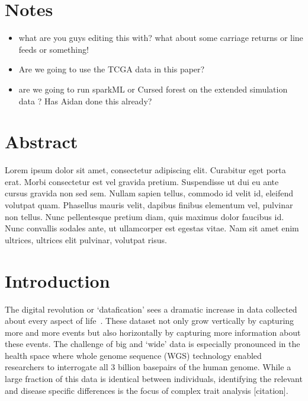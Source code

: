 \documentclass[10pt,letterpaper]{article}
\begin{document}
\section*{Notes}
\begin{itemize}
\item what are you guys editing this with?  what about some carriage
  returns or line feeds or something!
\item Are we going to use the TCGA data in this paper?
\item are we going to run sparkML or Cursed forest on the extended
  simulation data \cite[]{Genuer.et.al.2010}? Has Aidan done this already?
\end{itemize}


\section*{Abstract}
Lorem ipsum dolor sit amet, consectetur adipiscing elit. Curabitur eget porta erat. Morbi consectetur est vel gravida
pretium. Suspendisse ut dui eu ante cursus gravida non sed sem. Nullam sapien tellus, commodo id velit id, eleifend
volutpat quam. Phasellus mauris velit, dapibus finibus elementum vel, pulvinar non tellus. Nunc pellentesque pretium
diam, quis maximus dolor faucibus id. Nunc convallis sodales ante, ut ullamcorper est egestas vitae. Nam sit amet enim
ultrices, ultrices elit pulvinar, volutpat risus.

\linenumbers

\section*{Introduction}

The digital revolution or `datafication' sees a dramatic increase in data collected about every aspect of   
life~\cite{Loebbecke2015}.  These dataset not only grow vertically by capturing more and more events but also
horizontally by capturing more information about these events.  The challenge of big and `wide' data is especially
pronounced in the health space where whole genome sequence (WGS) technology enabled researchers to interrogate all 3
billion basepairs of the human genome.  While a large fraction of this data is identical between individuals, 
identifying the relevant and disease specific differences is the focus of complex trait analysis [citation].
\end{document}
